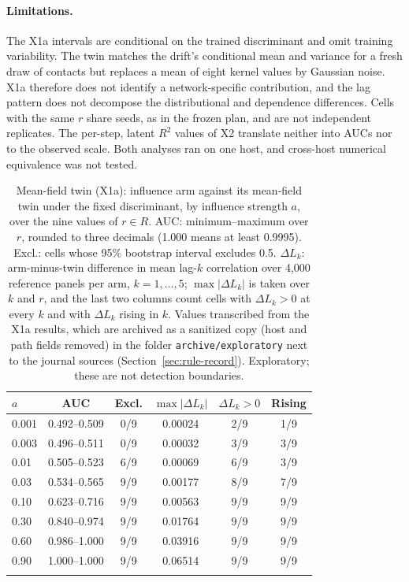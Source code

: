 \paragraph{Limitations.}
The X1a intervals are conditional on the trained discriminant and omit training variability. %
The twin matches the drift's conditional mean and variance for a fresh draw of contacts but replaces a mean of eight kernel values by Gaussian noise. %
X1a therefore does not identify a network-specific contribution, and the lag pattern does not decompose the distributional and dependence differences. %
Cells with the same $r$ share seeds, as in the frozen plan, and are not independent replicates. %
The per-step, latent $R^2$ values of X2 translate neither into AUCs nor to the observed scale. %
Both analyses ran on one host, and cross-host numerical equivalence was not tested. %

\begin{table}[htbp]
\centering
\footnotesize
\setlength{\tabcolsep}{3pt}
\caption{Mean-field twin (X1a): influence arm against its mean-field twin under the fixed discriminant, by influence strength $a$, over the nine values of $r\in R$. AUC: minimum--maximum over $r$, rounded to three decimals (1.000 means at least 0.9995). Excl.: cells whose 95\% bootstrap interval excludes 0.5. $\Delta L_k$: arm-minus-twin difference in mean lag-$k$ correlation over 4,000 reference panels per arm, $k=1,\ldots,5$; $\max|\Delta L_k|$ is taken over $k$ and $r$, and the last two columns count cells with $\Delta L_k>0$ at every $k$ and with $\Delta L_k$ rising in $k$. Values transcribed from the X1a results, which are archived as a sanitized copy (host and path fields removed) in the folder \texttt{archive/exploratory} next to the journal sources (Section~\ref{sec:rule-record}). Exploratory; these are not detection boundaries.}
\label{tab:supp-x1a}
\begin{tabular}{@{}lccccc@{}}
\toprule
$a$ & AUC & Excl. & $\max|\Delta L_k|$ & $\Delta L_k>0$ & Rising \\
\midrule
0.001 & 0.492--0.509 & 0/9 & 0.00024 & 2/9 & 1/9 \\
0.003 & 0.496--0.511 & 0/9 & 0.00032 & 3/9 & 3/9 \\
0.01 & 0.505--0.523 & 6/9 & 0.00069 & 6/9 & 3/9 \\
0.03 & 0.534--0.565 & 9/9 & 0.00177 & 8/9 & 7/9 \\
0.10 & 0.623--0.716 & 9/9 & 0.00563 & 9/9 & 9/9 \\
0.30 & 0.840--0.974 & 9/9 & 0.01764 & 9/9 & 9/9 \\
0.60 & 0.986--1.000 & 9/9 & 0.03916 & 9/9 & 9/9 \\
0.90 & 1.000--1.000 & 9/9 & 0.06514 & 9/9 & 9/9 \\
\botrule
\end{tabular}
\end{table}

